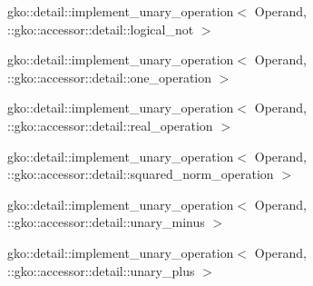 \begin{DoxyCompactList}
\begin{DoxyCompactList}
\end{DoxyCompactList}
\item gko\+:\+:detail\+:\+:implement\+\_\+unary\+\_\+operation$<$ Operand, \+:\+:gko\+:\+:accessor\+:\+:detail\+:\+:logical\+\_\+not $>$\begin{DoxyCompactList}
\item {}
\end{DoxyCompactList}
\item gko\+:\+:detail\+:\+:implement\+\_\+unary\+\_\+operation$<$ Operand, \+:\+:gko\+:\+:accessor\+:\+:detail\+:\+:one\+\_\+operation $>$\begin{DoxyCompactList}
\item {}
\end{DoxyCompactList}
\item gko\+:\+:detail\+:\+:implement\+\_\+unary\+\_\+operation$<$ Operand, \+:\+:gko\+:\+:accessor\+:\+:detail\+:\+:real\+\_\+operation $>$\begin{DoxyCompactList}
\item {}
\end{DoxyCompactList}
\item gko\+:\+:detail\+:\+:implement\+\_\+unary\+\_\+operation$<$ Operand, \+:\+:gko\+:\+:accessor\+:\+:detail\+:\+:squared\+\_\+norm\+\_\+operation $>$\begin{DoxyCompactList}
\item {}
\end{DoxyCompactList}
\item gko\+:\+:detail\+:\+:implement\+\_\+unary\+\_\+operation$<$ Operand, \+:\+:gko\+:\+:accessor\+:\+:detail\+:\+:unary\+\_\+minus $>$\begin{DoxyCompactList}
\item {}
\end{DoxyCompactList}
\item gko\+:\+:detail\+:\+:implement\+\_\+unary\+\_\+operation$<$ Operand, \+:\+:gko\+:\+:accessor\+:\+:detail\+:\+:unary\+\_\+plus $>$\begin{DoxyCompactList}

\end{DoxyCompactList}
\end{DoxyCompactList}
